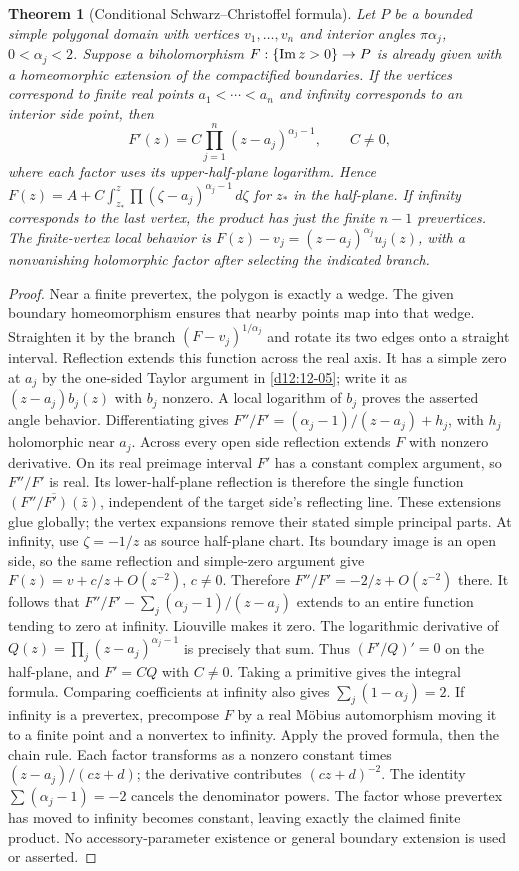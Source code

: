 \documentclass[11pt,a4paper,openany]{book}
\newtheorem{theorem}{Theorem}[chapter]
\theoremstyle{definition}
\theoremstyle{remark}\newtheorem{remark}[theorem]{Remark}
\newcommand{\dd}{\,d}\newcommand{\iu}{\mathrm i}
\newcommand{\family}[1]{}
\begin{document}
\begin{theorem}[Conditional Schwarz--Christoffel formula]\family{D12.12.06}\label{d12:12-06}
Let $P$ be a bounded simple polygonal domain with vertices $v_1,\ldots,v_n$ and interior angles $\pi\alpha_j$, $0<\alpha_j<2$. Suppose a biholomorphism $F:\{\operatorname{Im} z>0\}\to P$ is already given with a homeomorphic extension of the compactified boundaries. If the vertices correspond to finite real points $a_1<\cdots<a_n$ and infinity corresponds to an interior side point, then
\[
 F'(z)=C\prod_{j=1}^n(z-a_j)^{\alpha_j-1},\qquad C\ne0,
\]
where each factor uses its upper-half-plane logarithm. Hence $F(z)=A+C\int_{z_*}^z\prod(\zeta-a_j)^{\alpha_j-1}\dd\zeta$ for $z_* $ in the half-plane. If infinity corresponds to the last vertex, the product has just the finite $n-1$ prevertices. The finite-vertex local behavior is $F(z)-v_j=(z-a_j)^{\alpha_j}u_j(z)$, with a nonvanishing holomorphic factor after selecting the indicated branch.
\end{theorem}
\begin{proof}
Near a finite prevertex, the polygon is exactly a wedge. The given boundary homeomorphism ensures that nearby points map into that wedge. Straighten it by the branch $(F-v_j)^{1/\alpha_j}$ and rotate its two edges onto a straight interval. Reflection extends this function across the real axis. It has a simple zero at $a_j$ by the one-sided Taylor argument in \cref{d12:12-05}; write it as $(z-a_j)b_j(z)$ with $b_j$ nonzero. A local logarithm of $b_j$ proves the asserted angle behavior. Differentiating gives
$F''/F'=(\alpha_j-1)/(z-a_j)+h_j$, with $h_j$ holomorphic near $a_j$.
Across every open side reflection extends $F$ with nonzero derivative. On its real preimage interval $F'$ has a constant complex argument, so $F''/F'$ is real. Its lower-half-plane reflection is therefore the single function $\overline{(F''/F')(\bar z)}$, independent of the target side's reflecting line. These extensions glue globally; the vertex expansions remove their stated simple principal parts. At infinity, use $\zeta=-1/z$ as source half-plane chart. Its boundary image is an open side, so the same reflection and simple-zero argument give $F(z)=v+c/z+O(z^{-2})$, $c\ne0$. Therefore $F''/F'=-2/z+O(z^{-2})$ there. It follows that
$F''/F'-\sum_j(\alpha_j-1)/(z-a_j)$ extends to an entire function tending to zero at infinity. Liouville makes it zero. The logarithmic derivative of $Q(z)=\prod_j(z-a_j)^{\alpha_j-1}$ is precisely that sum. Thus $(F'/Q)'=0$ on the half-plane, and $F'=CQ$ with $C\ne0$. Taking a primitive gives the integral formula. Comparing coefficients at infinity also gives $\sum_j(1-\alpha_j)=2$.
If infinity is a prevertex, precompose $F$ by a real M\"obius automorphism moving it to a finite point and a nonvertex to infinity. Apply the proved formula, then the chain rule. Each factor transforms as a nonzero constant times $(z-a_j)/(cz+d)$; the derivative contributes $(cz+d)^{-2}$. The identity $\sum(\alpha_j-1)=-2$ cancels the denominator powers. The factor whose prevertex has moved to infinity becomes constant, leaving exactly the claimed finite product. No accessory-parameter existence or general boundary extension is used or asserted.
\end{proof}
\end{document}
